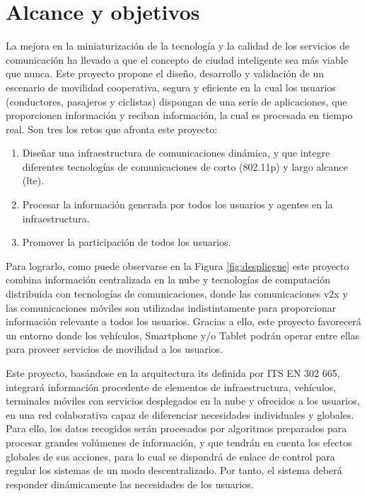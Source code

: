 \chapter{Alcance y objetivos}\label{cha:alcance}
La mejora en la miniaturización de la tecnología y la calidad de los servicios
de comunicación ha llevado a que el concepto de ciudad inteligente sea más
viable que nunca. Este proyecto propone el diseño, desarrollo y validación de
un escenario de movilidad cooperativa, segura y eficiente en la cual los
usuarios (conductores, pasajeros y ciclistas) dispongan de una serie de
aplicaciones, que proporcionen información y reciban información, la cual es
procesada en tiempo real. Son tres los retos que afronta este proyecto:

\begin{enumerate}
	\item Diseñar una infraestructura de comunicaciones dinámica, y que integre
	diferentes tecnologías de comunicaciones de corto (\Gls{802.11p}) y largo
	alcance (\gls{lte}).

	\item Procesar la información generada por todos los usuarios y agentes en la
	infraestructura.

	\item Promover la participación de todos los usuarios.

\end{enumerate}
Para lograrlo, como puede observarse en la Figura \ref{fig:despliegue} este
proyecto combina información centralizada en la nube y tecnologías de
computación distribuida con tecnologías de comunicaciones, donde las
comunicaciones \gls{v2x} y las comunicaciones móviles son utilizadas
indistintamente para proporcionar información relevante a todos los usuarios.
Gracias a ello, este proyecto favorecerá un entorno donde los vehículos,
Smartphone y/o Tablet podrán operar entre ellas para proveer servicios de
movilidad a los usuarios.

Este proyecto, basándose en la arquitectura \gls{its} definida por ITS EN 302
665, integrará información procedente de elementos de infraestructura,
vehículos, terminales móviles con servicios desplegados en la nube y ofrecidos
a los usuarios, en una red colaborativa capaz de diferenciar necesidades
individuales y globales. Para ello, los datos recogidos serán procesados por
algoritmos preparados para procesar grandes volúmenes de información, y que
tendrán en cuenta los efectos globales de sus acciones, para lo cual se
dispondrá de enlace de control para regular los sistemas de un modo
descentralizado. Por tanto, el sistema deberá responder dinámicamente las
necesidades de los usuarios.


